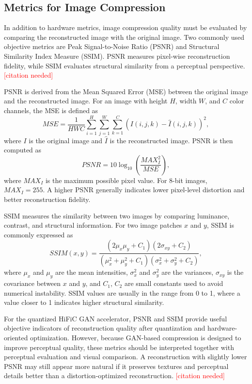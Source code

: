 \documentclass[11pt]{report}
\begin{document}
\subsection{Metrics for Image Compression}

In addition to hardware metrics, image compression quality must be evaluated by comparing the reconstructed image with the original image. Two commonly used objective metrics are Peak Signal-to-Noise Ratio (PSNR) and Structural Similarity Index Measure (SSIM). PSNR measures pixel-wise reconstruction fidelity, while SSIM evaluates structural similarity from a perceptual perspective. \textcolor{red}{[citation needed]}

PSNR is derived from the Mean Squared Error (MSE) between the original image and the reconstructed image. For an image with height $H$, width $W$, and $C$ color channels, the MSE is defined as
\begin{equation}
MSE = \frac{1}{HWC}\sum_{i=1}^{H}\sum_{j=1}^{W}\sum_{k=1}^{C}\left(I(i,j,k)-\hat{I}(i,j,k)\right)^2,
\end{equation}
where $I$ is the original image and $\hat{I}$ is the reconstructed image. PSNR is then computed as
\begin{equation}
PSNR = 10\log_{10}\left(\frac{MAX_I^2}{MSE}\right),
\end{equation}
where $MAX_I$ is the maximum possible pixel value. For 8-bit images, $MAX_I = 255$. A higher PSNR generally indicates lower pixel-level distortion and better reconstruction fidelity.

SSIM measures the similarity between two images by comparing luminance, contrast, and structural information. For two image patches $x$ and $y$, SSIM is commonly expressed as
\begin{equation}
SSIM(x,y) = \frac{(2\mu_x\mu_y + C_1)(2\sigma_{xy} + C_2)}{(\mu_x^2 + \mu_y^2 + C_1)(\sigma_x^2 + \sigma_y^2 + C_2)},
\end{equation}
where $\mu_x$ and $\mu_y$ are the mean intensities, $\sigma_x^2$ and $\sigma_y^2$ are the variances, $\sigma_{xy}$ is the covariance between $x$ and $y$, and $C_1$, $C_2$ are small constants used to avoid numerical instability. SSIM values are usually in the range from 0 to 1, where a value closer to 1 indicates higher structural similarity.

For the quantized HiFiC GAN accelerator, PSNR and SSIM provide useful objective indicators of reconstruction quality after quantization and hardware-oriented optimization. However, because GAN-based compression is designed to improve perceptual quality, these metrics should be interpreted together with perceptual evaluation and visual comparison. A reconstruction with slightly lower PSNR may still appear more natural if it preserves textures and perceptual details better than a distortion-optimized reconstruction. \textcolor{red}{[citation needed]}
\end{document}
